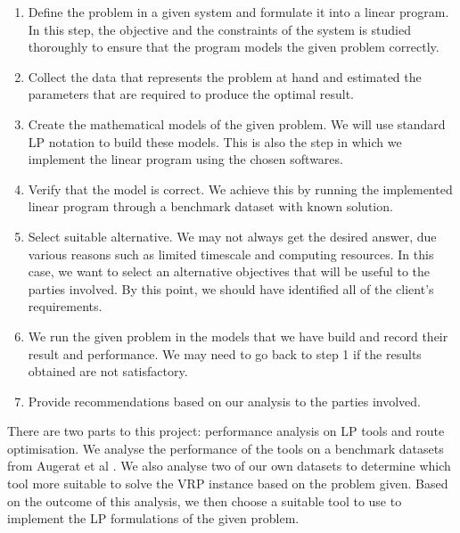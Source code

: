 \begin{enumerate}
\item Define the problem in a given system and formulate it into a linear program. In this step, the objective and the constraints of the system is studied thoroughly to ensure
that the program models the given problem correctly.
\item Collect the data that represents the problem at hand and estimated the parameters that are required to produce
the optimal result.
\item Create the mathematical models of the given problem. We will use standard LP notation to build these models. This is
also the step in which we implement the linear program using the chosen softwares.
\item Verify that the model is correct. We achieve this by running the implemented linear program through a benchmark dataset with known solution.
\item Select suitable alternative. We may not always get the desired answer, due various reasons such as limited timescale and computing resources.
In this case, we want to select an alternative objectives that will be useful to the parties involved. By this point, we should have identified all of the client's requirements.
\item We run the given problem in the models that we have build and record their result and performance. We may need to go back to step 1 if the results obtained
are not satisfactory.
\item Provide recommendations based on our analysis to the parties involved.
\end{enumerate}

There are two parts to this project: performance analysis on LP tools and route optimisation. We analyse the performance of the tools on
a benchmark datasets from Augerat et al \cite{Augerat1998}. We also analyse two of our own datasets to determine which tool more suitable to
solve the VRP instance based on the problem given. Based on the outcome of this analysis, we then choose a suitable tool
to use to implement the LP formulations of the given problem.

